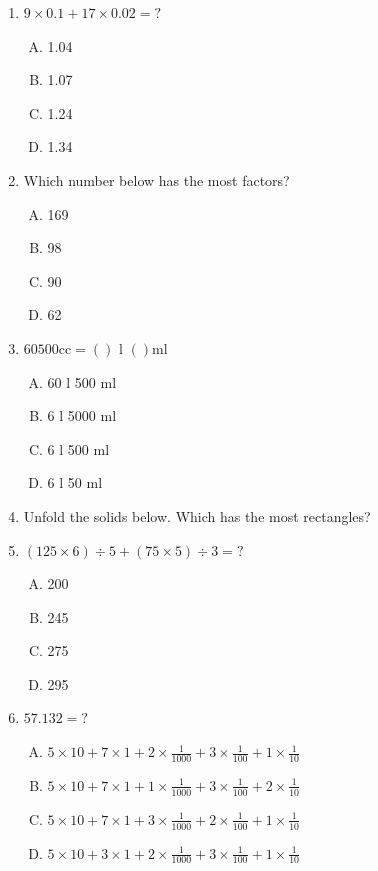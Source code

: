 \documentclass[12pt]{scrartcl}
\begin{document}
\begin{enumerate}
\item $9 \times 0.1 + 17 \times 0.02 = ?$
\begin{enumerate}[(A)]
    \item 1.04 \item 1.07 \item 1.24 \item 1.34
\end{enumerate}

\item Which number below has the most factors?
\begin{enumerate}[(A)]
    \item 169 \item 98 \item 90 \item 62
\end{enumerate}

\item $60500\text{cc} = ( )\text{ l }( )\text{ml}$
\begin{enumerate}[(A)]
    \item 60 l 500 ml \item 6 l 5000 ml \item 6 l 500 ml \item 6 l 50 ml
\end{enumerate}

\item Unfold the solids below. Which has the most rectangles?

\item $(125 \times 6) \div 5 + (75 \times 5) \div 3 = ?$
\begin{enumerate}[(A)]
    \item 200 \item 245 \item 275 \item 295
\end{enumerate}

\item $57.132 = ?$
\begin{enumerate}[(A)]
    \item $5 \times 10 + 7 \times 1 + 2 \times \frac{1}{1000} + 3 \times \frac{1}{100} + 1 \times \frac{1}{10}$
    \item $5 \times 10 + 7 \times 1 + 1 \times \frac{1}{1000} + 3 \times \frac{1}{100} + 2 \times \frac{1}{10}$
    \item $5 \times 10 + 7 \times 1 + 3 \times \frac{1}{1000} + 2 \times \frac{1}{100} + 1 \times \frac{1}{10}$
    \item $5 \times 10 + 3 \times 1 + 2 \times \frac{1}{1000} + 3 \times \frac{1}{100} + 1 \times \frac{1}{10}$
\end{enumerate}


\end{enumerate}
\end{document}
